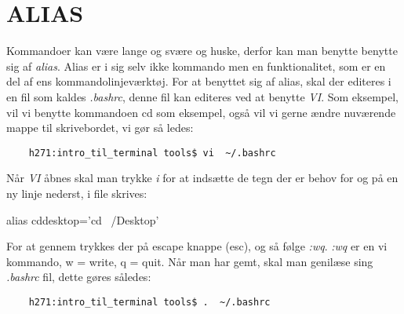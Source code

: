 \section{ALIAS}
Kommandoer kan være lange og svære og huske, derfor kan man benytte benytte sig af \textit{alias}.
Alias er i sig selv ikke kommando men en funktionalitet, som er en del af ens kommandolinjeværktøj. 
For at benyttet sig af alias, skal der editeres i en fil som kaldes \textit{.bashrc}, denne fil 
kan editeres ved at benytte \textit{VI}. Som eksempel, vil vi benytte kommandoen cd som eksempel, 
også vil vi gerne ændre nuværende mappe til skrivebordet, vi gør så ledes:
\begin{lstlisting}
	h271:intro_til_terminal tools$ vi  ~/.bashrc
\end{lstlisting}
Når \textit{VI} åbnes skal man trykke \textit{i} for at indsætte de tegn der er behov for og på en ny linje nederst, i file skrives:
\begin{center}
  alias cddesktop='cd ~/Desktop'
\end{center}
For at gennem trykkes der på escape knappe (esc), og så følge \textit{:wq}. \textit{:wq} er en vi kommando, w = write, q = quit. Når man har gemt, skal man genilæse sing \textit{.bashrc} fil, dette gøres således:
\begin{lstlisting}
	h271:intro_til_terminal tools$ .  ~/.bashrc
\end{lstlisting}
